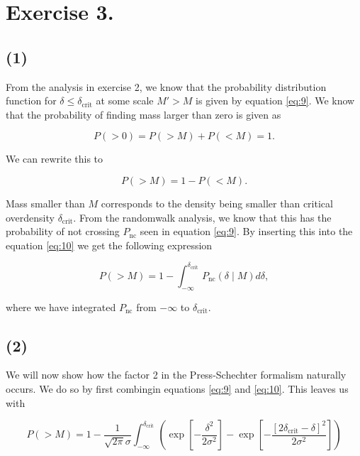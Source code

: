 \documentclass[a4paper,10pt]{article}
\begin{document}
\section*{Exercise 3.}
\subsection*{(1)}

From the analysis in exercise 2, we know that the probability distribution function for $\delta \leq \delta_\text{crit}$ at some scale $M' > M$ is given by equation \eqref{eq:9}. We know that the probability of finding mass larger than zero is given as

\[
    P(> 0) = P( > M) + P( < M) = 1.
\]

\noindent We can rewrite this to

\begin{equation}\label{eq:10}
    P( > M ) = 1 - P ( < M ).
\end{equation}

\noindent Mass smaller than $M$ corresponds to the density being smaller than critical overdensity $\delta_\text{crit}$. From the randomwalk analysis, we know that this has the probability of not crossing $P_\text{nc}$ seen in equation \eqref{eq:9}. By inserting this into the equation \eqref{eq:10} we get the following expression

\begin{equation}\label{eq:10}
    P(> M) = 1 - \int_{-\infty}^{\delta_\text{crit}} P_\text{nc} (\delta \mid M) d\delta,
\end{equation}

\noindent where we have integrated $P_\text{nc}$ from $-\infty$ to $\delta_\text{crit}$.

\subsection*{(2)}

We will now show how the factor 2 in the Press-Schechter formalism naturally occurs. We do so by first combingin equations \eqref{eq:9} and \eqref{eq:10}. This leaves us with 

\begin{equation}\label{eq:11}
    P(> M) = 1 - \frac{1}{\sqrt{2 \pi} \sigma} \int_{-\infty}^{\delta_\text{crit}} \left( \exp \left[- \frac{\delta^2}{2\sigma^2} \right] - \exp \left[ - \frac{[2\delta_\text{crit} - \delta]^2 }{2\sigma^2} \right] \right)
\end{equation}
\end{document}
